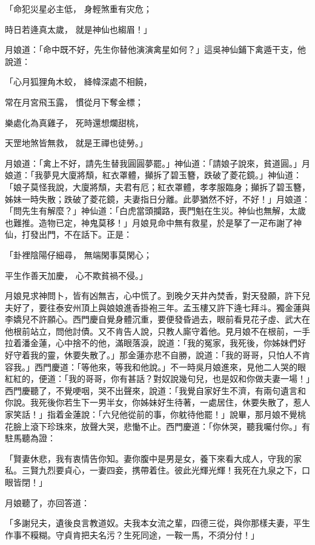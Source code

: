 \begin{showcontents}{}
「命犯災星必主低，  身輕煞重有灾危；

時日若逄真太歲，  就是神仙也縐眉！」

月娘道：「命中既不好，先生你替他演演禽星如何？」這吳神仙鋪下禽遁干支，他說道：

「心月狐狸角木蛟，  絳幃深處不相饒，

常在月宮飛玉露，  慣從月下奪金標；

樂處化為真雞子，  死時還想爛甜桃，

天罡地煞皆無救，  就是王禪也徒勞。」

月娘道：「禽上不好，請先生替我圓圓夢罷。」神仙道：「請娘子說來，貧道圓。」月娘道：「我夢見大廈將頹，紅衣罩體，攧拆了碧玉簪，跌破了菱花鏡。」神仙道：「娘子莫怪我說，大廈將頹，夫君有厄；紅衣罩體，孝孝服臨身；攧拆了碧玉簪，姊妹一時失散；跌破了菱花鏡，夫妻指日分離。此夢猶然不好，不好！」月娘道：「問先生有解麼？」神仙道：「白虎當頭攔路，喪門魁在生災。神仙也無解，太歲也難推。造物已定，神鬼莫移！」月娘見命中無有救星，於是拏了一疋布謝了神仙，打發出門，不在話下。正是：

「卦裡陰陽仔細尋，  無端閑事莫閑心；

平生作善天加慶，  心不欺貧禍不侵。」

月娘見求神問卜，皆有凶無吉，心中慌了。到晚夕天井內焚香，對天發願，許下兒夫好了，要往泰安州頂上與娘娘進香掛袍三年。孟玉樓又許下逄七拜斗。獨金蓮與李嬌兒不許願心。西門慶自覺身體沉重，要便發昏過去，眼前看見花子虛、武大在他根前站立，問他討債。又不肯告人說，只教人廝守着他。見月娘不在根前，一手拉着潘金蓮，心中捨不的他，滿眼落淚，說道：「我的冤家，我死後，你姊妹們好好守着我的靈，休要失散了。」那金蓮亦悲不自勝，說道：「我的哥哥，只怕人不肯容我。」西門慶道：「等他來，等我和他說。」不一時吳月娘進來，見他二人哭的眼紅紅的，便道：「我的哥哥，你有甚話？對奴說幾句兒，也是奴和你做夫妻一場！」西門慶聽了，不覺哽咽，哭不出聲來，說道：「我覺自家好生不濟，有兩句遺言和你說。我死後你若生下一男半女，你姊妹好生待著，一處居住，休要失散了，惹人家笑話！」指着金蓮說：「六兒他從前的事，你躭待他罷！」說畢，那月娘不覺桃花臉上滾下珍珠來，放聲大哭，悲慟不止。西門慶道：「你休哭，聽我囑付你。」有駐馬聽為證：

「賢妻休悲，我有衷情告你知。妻你腹中是男是女，養下來看大成人，守我的家私。三賢九烈要貞心，一妻四妾，携帶着住。彼此光輝光輝！我死在九泉之下，口眼皆閉！」

月娘聽了，亦回答道：

「多謝兒夫，遺後良言教道奴。夫我本女流之輩，四德三從，與你那樣夫妻，平生作事不糢糊。守貞肯把夫名污？生死同途，一鞍一馬，不須分付！」


\end{showcontents}
